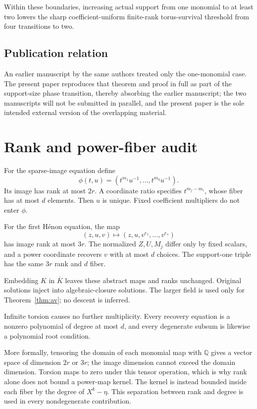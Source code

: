 \documentclass[11pt]{article}
\theoremstyle{definition}
\begin{document}
Within these boundaries, increasing actual support from one monomial to at least two lowers the sharp coefficient-uniform finite-rank torus-survival threshold from four transitions to two.

\subsection{Publication relation}

An earlier manuscript by the same authors treated only the one-monomial case. The present paper reproduces that theorem and proof in full as part of the support-size phase transition, thereby absorbing the earlier manuscript; the two manuscripts will not be submitted in parallel, and the present paper is the sole intended external version of the overlapping material.

\appendix

\section{Rank and power-fiber audit}
\label{app:rank}

For the sparse-image equation define
\[
 \phi(t,u)=(t^{m_1}u^{-1},\ldots,t^{m_q}u^{-1}).
\]
Its image has rank at most \(2r\). A coordinate ratio specifies \(t^{m_j-m_i}\), whose fiber has at most \(d\) elements. Then \(u\) is unique. Fixed coefficient multipliers do not enter \(\phi\).

For the first Hénon equation, the map
\[
 (z,u,v)\longmapsto(z,u,v^{e_1},\ldots,v^{e_s})
\]
has image rank at most \(3r\). The normalized \(Z,U,M_j\) differ only by fixed scalars, and a power coordinate recovers \(v\) with at most \(d\) choices. The support-one triple has the same \(3r\) rank and \(d\) fiber.

Embedding \(K\) in \(\overline K\) leaves these abstract maps and ranks unchanged. Original solutions inject into algebraic-closure solutions. The larger field is used only for Theorem~\ref{thm:av}; no descent is inferred.

Infinite torsion causes no further multiplicity. Every recovery equation is a nonzero polynomial of degree at most \(d\), and every degenerate subsum is likewise a polynomial root condition.


More formally, tensoring the domain of each monomial map with \(\mathbb Q\) gives a vector space of dimension \(2r\) or \(3r\); the image dimension cannot exceed the domain dimension. Torsion maps to zero under this tensor operation, which is why rank alone does not bound a power-map kernel. The kernel is instead bounded inside each fiber by the degree of \(X^k-\eta\). This separation between rank and degree is used in every nondegenerate contribution.
\end{document}
